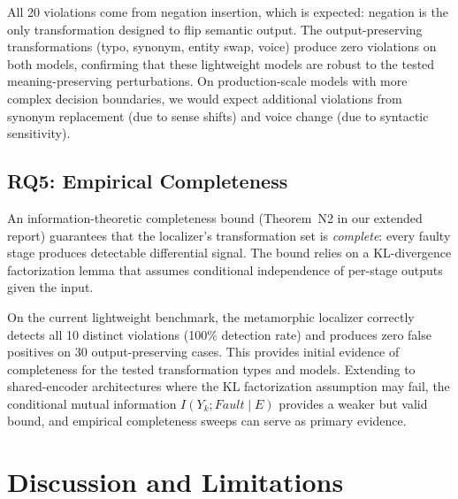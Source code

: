 \documentclass[sigconf,nonacm]{acmart}
\begin{document}
All 20 violations come from negation insertion, which is expected: negation is the only transformation designed to flip semantic output.
The output-preserving transformations (typo, synonym, entity swap, voice) produce zero violations on both models, confirming that these lightweight models are robust to the tested meaning-preserving perturbations.
On production-scale models with more complex decision boundaries, we would expect additional violations from synonym replacement (due to sense shifts) and voice change (due to syntactic sensitivity).

\subsection{RQ5: Empirical Completeness}\label{sec:empirical-completeness}

An information-theoretic completeness bound (Theorem~N2 in our extended report) guarantees that the localizer's transformation set is \emph{complete}: every faulty stage produces detectable differential signal.
The bound relies on a KL-divergence factorization lemma that assumes conditional independence of per-stage outputs given the input.

On the current lightweight benchmark, the metamorphic localizer correctly detects all 10 distinct violations (100\% detection rate) and produces zero false positives on 30 output-preserving cases.
This provides initial evidence of completeness for the tested transformation types and models.
Extending to shared-encoder architectures where the KL factorization assumption may fail, the conditional mutual information $I(Y_k; \mathit{Fault} \mid E)$ provides a weaker but valid bound, and empirical completeness sweeps can serve as primary evidence.

\section{Discussion and Limitations}\label{sec:discussion}
\end{document}
